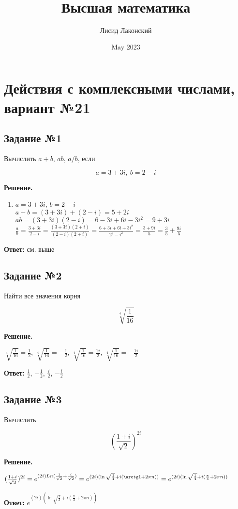 \documentclass{article}
\title{Высшая математика}
\author{Лисид Лаконский}
\date{May 2023}
\begin{document}
\raggedright

\maketitle

\tableofcontents
\pagebreak

\section{Действия с комплексными числами, вариант №21}

\subsection{Задание №1}

Вычислить $a + b$, $a b$, $a / b$, если

$$
a = 3 + 3 i, \ b = 2 - i
$$

\textbf{Решение.}

\begin{enumerate}
    \item $a = 3 + 3 i$, $b = 2 - i$ \\
    $a + b = (3 + 3 i) + (2 - i) = 5 + 2 i$ \\
    $ab = (3 + 3 i) (2 - i) = 6 - 3i + 6i - 3 i^2 = 9 + 3 i $ \\
    $\frac{a}{b} = \frac{3 + 3 i}{2 - i} = \frac{(3 + 3 i)(2 + i)}{(2 - i)(2 + i)} = \frac{6 + 3 i + 6 i + 3 i^2}{2^2 - i^2} = \frac{3 + 9i}{5} = \frac{3}{5} + \frac{9 i}{5}$
\end{enumerate}

\textbf{Ответ:} см. выше

\subsection{Задание №2}

Найти все значения корня

$$
\sqrt[4]{\frac{1}{16}}
$$

\textbf{Решение.}

$\sqrt[4]{\frac{1}{16}} = \frac{1}{2}$, $\sqrt[4]{\frac{1}{16}} = -\frac{1}{2}$, $\sqrt[4]{\frac{1}{16}} = \frac{1 i}{2}$, $\sqrt[4]{\frac{1}{16}} = - \frac{1 i}{2}$

\hfill

\textbf{Ответ:} $\frac{1}{2}$, $-\frac{1}{2}$, $\frac{i}{2}$, $-\frac{i}{2}$

\subsection{Задание №3}

Вычислить

$$
(\frac{1 + i}{\sqrt{2}})^{2 i}
$$

\textbf{Решение.}

$(\frac{1 + i}{\sqrt{2}})^{2 i} = e^{(2 i) Ln (\frac{1}{\sqrt{2}} + \frac{i}{\sqrt{2}})} = e^{(2 i) (\ln \sqrt{\frac{1}{4}} + i (\arctg 1 + 2 \pi n))} = e^{(2 i) (\ln \sqrt{\frac{1}{4}} + i (\frac{\pi}{4} + 2 \pi n))}$

\hfill

\textbf{Ответ:} $e^{(2 i) (\ln \sqrt{\frac{1}{4}} + i (\frac{\pi}{4} + 2 \pi n))}$
\end{document}
